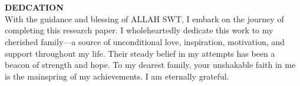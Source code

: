 \newenvironment{dedication}
{%
    \thispagestyle{empty}%
    \vspace*{\stretch{1}}%
    \centering
    \justifying      %
}
{\par %
    \vspace{\stretch{3}} %
    \clearpage           %
}

\section*{}
\begin{dedication}{\textbf{DEDCATION}}
    \\
    With the guidance and blessing of ALLAH SWT, I embark on the journey of
    completing this research paper. I wholeheartedly dedicate this work to my cherished
    family---a source of unconditional love, inspiration, motivation, and support
    throughout my life. Their steady belief in my attempts has been
    a beacon of strength and hope. To my dearest family, your unshakable faith in me
    is the mainspring of my achievements. I am eternally grateful.
\end{dedication}